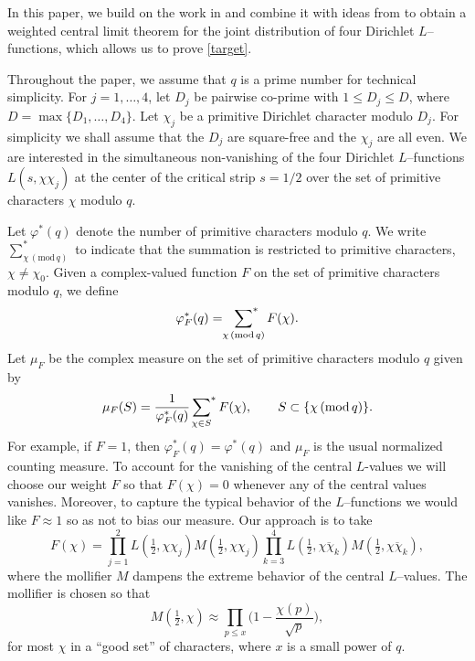 \documentclass[12pt, reqno]{amsart}
\renewcommand{\pmod}[1]{\,(\mathrm{mod}\,#1)}
\numberwithin{equation}{section}
\numberwithin{theorem}{section}
\numberwithin{equation}{section}
\def\sumstar{\sideset{}{^*}\sum}
\begin{document}
In this paper, we build on the work in \cite{BELP} and combine it with ideas from \cite{BFM} to obtain a weighted central limit theorem for the joint distribution of four Dirichlet $L$--functions, which allows us to prove \eqref{target}. 



 Throughout the paper, we assume that $q$ is a prime number for technical simplicity.  For $j=1,\ldots, 4$, let $D_j$ be pairwise co-prime with $1\leq D_j\leq D$, where $D= \max\{D_1,\ldots, D_4\}$. Let $\chi_j$ be a primitive Dirichlet character modulo $D_j$. For simplicity we shall assume that the $D_j$ are square-free and the $\chi_j$ are all even. We are interested in the simultaneous non-vanishing of the four Dirichlet $L$--functions $L(s,\chi\chi_j)$ at the center of the critical strip $s=1/2$ over the set of primitive characters $\chi$ modulo $q$.

Let $\varphi^{*}(q)$ denote the number of primitive characters modulo $q$. We write $\sum_{\chi \pmod q}^*$ to indicate that the summation is restricted to primitive characters, $\chi\ne\chi_0$. Given a complex-valued function $F$ on the set of primitive characters modulo $q$, we define 
\[
\varphi_F^{*}(q)=\sumstar_{\chi \pmod q} F(\chi).
\]
Let $\mu_F$ be the complex measure on the set of primitive characters modulo $q$ given by
\[
\mu_F(S)= \frac{1}{\varphi_F^{*}(q)}\sumstar_{\chi \in S} F(\chi), \qquad S \subset \{ \chi \pmod q\}.
\]
For example, if $F=1$, then $\varphi_F^*(q)=\varphi^{*}(q)$ and $\mu_F$ is the usual normalized counting measure. 
To account for the vanishing of the central $L$-values we will choose our weight $F$ so that $F(\chi)=0$ whenever any of the central values vanishes.
Moreover, 
to capture the typical behavior of the $L$--functions we would like $F \approx 1$ so as not to bias our measure. 
Our approach is to take 
\[
F(\chi)=\prod_{j=1}^2 L(\tfrac12,\chi\chi_j)M(\tfrac12,\chi\chi_j)\prod_{k=3}^4 L(\tfrac12,\overline{\chi\chi_k})M(\tfrac12,\overline{\chi\chi_k}),
\] 
where the mollifier $M$ dampens the extreme behavior of the central $L$--values. The mollifier is chosen so that
$$M (  \tfrac{1}{2},\chi) \approx \prod_{p \leq x} \Big( 1 - \frac{\chi(p)}{\sqrt{p}}\Big),
$$ for most $\chi$ in a ``good set'' of characters, where $x$ is a small power of $q$.  
\end{document}
